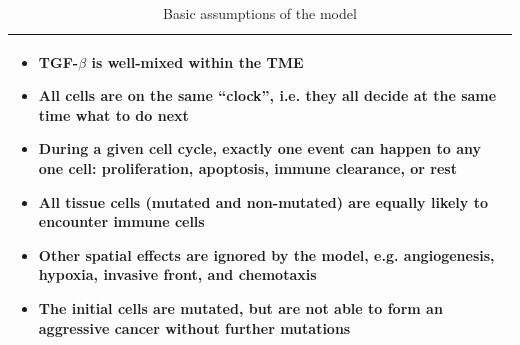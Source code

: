 \documentclass[11pt]{article}
\begin{document}
\begin{table}[H]
\begin{tabular}{|p{\textwidth}|}
\hline
\begin{itemize}
\item TGF-$\beta$ is well-mixed within the TME
\item All cells are on the same ``clock'', i.e. they all decide at the same time what to do next
\item During a given cell cycle, exactly one event can happen to any one cell: proliferation, apoptosis, immune clearance, or rest
\item All tissue cells (mutated and non-mutated) are equally likely to encounter immune cells
\item Other spatial effects are ignored by the model, e.g. angiogenesis, hypoxia, invasive front, and chemotaxis
\item The initial cells are mutated, but are not able to form an aggressive cancer without further mutations
\end{itemize}
\\
\hline
\end{tabular}
\caption{Basic assumptions of the model}
\label{table:model_assumptions}
\end{table}
\end{document}
